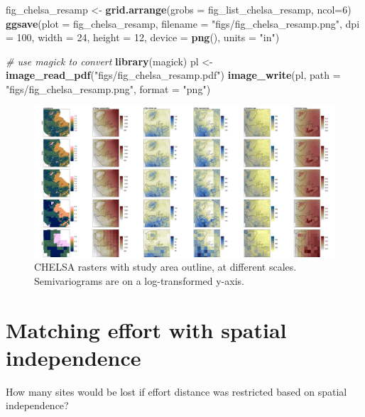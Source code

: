 \documentclass[]{article}
\newenvironment{Shaded}{}{}
\newcommand{\CommentTok}[1]{\textcolor[rgb]{0.38,0.63,0.69}{\textit{#1}}}
\newcommand{\DataTypeTok}[1]{\textcolor[rgb]{0.56,0.13,0.00}{#1}}
\newcommand{\DecValTok}[1]{\textcolor[rgb]{0.25,0.63,0.44}{#1}}
\newcommand{\KeywordTok}[1]{\textcolor[rgb]{0.00,0.44,0.13}{\textbf{#1}}}
\newcommand{\NormalTok}[1]{#1}
\newcommand{\StringTok}[1]{\textcolor[rgb]{0.25,0.44,0.63}{#1}}
\begin{document}
\begin{Shaded}
\begin{Highlighting}[]
\NormalTok{fig_chelsa_resamp <-}\StringTok{ }\KeywordTok{grid.arrange}\NormalTok{(}\DataTypeTok{grobs =}\NormalTok{ fig_list_chelsa_resamp, }\DataTypeTok{ncol=}\DecValTok{6}\NormalTok{)}
\KeywordTok{ggsave}\NormalTok{(}\DataTypeTok{plot =}\NormalTok{ fig_chelsa_resamp, }\DataTypeTok{filename =} \StringTok{"figs/fig_chelsa_resamp.png"}\NormalTok{, }\DataTypeTok{dpi =} \DecValTok{100}\NormalTok{, }\DataTypeTok{width =} \DecValTok{24}\NormalTok{, }\DataTypeTok{height =} \DecValTok{12}\NormalTok{, }\DataTypeTok{device =} \KeywordTok{png}\NormalTok{(), }\DataTypeTok{units =} \StringTok{"in"}\NormalTok{)}

\CommentTok{# use magick to convert}
\KeywordTok{library}\NormalTok{(magick)}
\NormalTok{pl <-}\StringTok{ }\KeywordTok{image_read_pdf}\NormalTok{(}\StringTok{"figs/fig_chelsa_resamp.pdf"}\NormalTok{)}
\KeywordTok{image_write}\NormalTok{(pl, }\DataTypeTok{path =} \StringTok{"figs/fig_chelsa_resamp.png"}\NormalTok{, }\DataTypeTok{format =} \StringTok{"png"}\NormalTok{)}
\end{Highlighting}
\end{Shaded}

\begin{figure}
\centering
\includegraphics{figs/fig_chelsa_resamp.png}
\caption{CHELSA rasters with study area outline, at different scales. Semivariograms are on a log-transformed y-axis.}
\end{figure}

\hypertarget{matching-effort-with-spatial-independence}{%
\section{Matching effort with spatial independence}\label{matching-effort-with-spatial-independence}}

How many sites would be lost if effort distance was restricted based on spatial independence?
\end{document}
